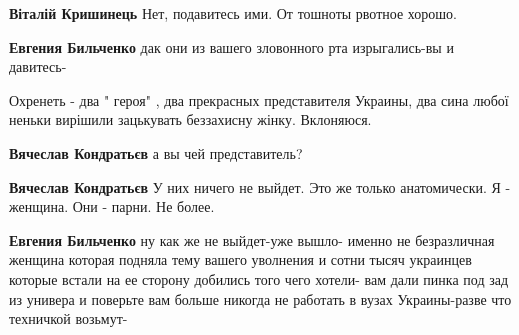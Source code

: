 \begin{itemize}
\begin{itemize}
 
\textbf{Віталій Кришинець} Нет, подавитесь ими. От тошноты рвотное хорошо.

 
\textbf{Евгения Бильченко} дак они из вашего зловонного рта изрыгались-вы и давитесь-

 
Охренеть - два " героя" , два прекрасных представителя Украины, два сина любої неньки вирішили зацькувать беззахисну жінку.
Вклоняюся.

 
\textbf{Вячеслав Кондратьєв} а вы чей представитель?

 
\textbf{Вячеслав Кондратьєв} У них ничего не выйдет. Это же только анатомически. Я - женщина. Они - парни. Не более.

 
\textbf{Евгения Бильченко} ну как же не выйдет-уже вышло- именно не
безразличная женщина которая подняла тему вашего уволнения и сотни тысяч
украинцев которые встали на ее сторону добились того чего хотели- вам дали
пинка под зад из универа и поверьте вам больше никогда не работать в вузах
Украины-разве что техничкой возьмут-


\end{itemize}
\end{itemize}

